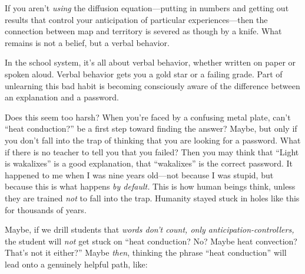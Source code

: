 {
 If you aren't \textit{using} the diffusion
equation---putting in numbers and getting out results that control your
anticipation of particular experiences---then the connection between
map and territory is severed as though by a knife. What remains is not
a belief, but a verbal behavior.}

{
 In the school system, it's all about verbal
behavior, whether written on paper or spoken aloud. Verbal behavior
gets you a gold star or a failing grade. Part of unlearning this bad
habit is becoming consciously aware of the difference between an
explanation and a password.}

{
 Does this seem too harsh? When you're faced by a
confusing metal plate, can't ``heat
conduction?'' be a first step toward finding the
answer? Maybe, but only if you don't fall into the trap
of thinking that you are looking for a password. What if there is no
teacher to tell you that you failed? Then you may think that
``Light is wakalixes'' is a good
explanation, that ``wakalixes'' is
the correct password. It happened to me when I was nine years old---not
because I was stupid, but because this is what happens \textit{by
default.} This is how human beings think, unless they are trained
\textit{not} to fall into the trap. Humanity stayed stuck in holes like
this for thousands of years.}

{
 Maybe, if we drill students that \textit{words
don't count, only anticipation-controllers,} the
student will \textit{not} get stuck on ``heat
conduction? No? Maybe heat convection? That's not it
either?'' Maybe \textit{then}, thinking the phrase
``heat conduction'' will lead onto a
genuinely helpful path, like:}

